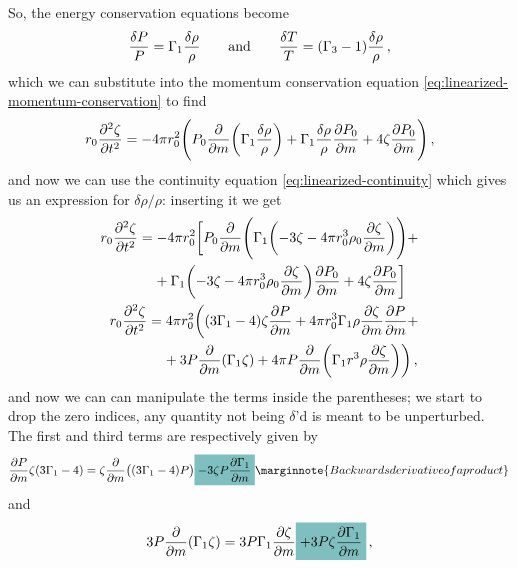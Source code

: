 \documentclass[main.tex]{subfiles}
\begin{document}
So, the energy conservation equations become 
%
\begin{align}
\frac{ \delta P}{P} = \Gamma_1 \frac{ \delta \rho }{\rho }
\qquad \text{and} \qquad
\frac{ \delta T }{T} = \qty(\Gamma_3 -1) \frac{ \delta \rho }{\rho }
\,,
\end{align}
%
which we can substitute into the momentum conservation equation \eqref{eq:linearized-momentum-conservation} to find 
%
\begin{align}
r_0 \pdv[2]{\zeta }{t} = 
- 4 \pi r_0^2 \qty(
P_0 \pdv{}{m} \qty(\Gamma_1  \frac{ \delta \rho}{\rho })
+ \Gamma_1 \frac{ \delta \rho }{\rho } \pdv{P_0}{m}
+ 4 \zeta \pdv{P_0 }{m}
)
\,,
\end{align}
%
and now we can use the continuity equation \eqref{eq:linearized-continuity} which gives us an expression for \(\delta \rho  / \rho \): inserting it we get 
%
\begin{align}
\begin{split}
r_0 \pdv[2]{\zeta }{t} &= 
- 4 \pi r_0^2 \bigg[
P_0 \pdv{}{m} \qty(\Gamma_1  \qty(-3\zeta - 4 \pi r_0^3 \rho_0 \pdv{\zeta }{m})) + \\
&\phantom{=}\ + \Gamma_1 \qty(- 3\zeta - 4 \pi r_0^3 \rho_0 \pdv{\zeta }{m}) \pdv{P_0}{m}
+ 4 \zeta \pdv{P_0 }{m}
\bigg]
\end{split}  \\
\label{eq:step0-LAWE-derivation-substituted}
\begin{split}
r_0 \pdv[2]{\zeta }{t} &= 4 \pi r_0^2 \bigg(
(3 \Gamma_1 - 4)\zeta \pdv{P}{m} 
+ 4 \pi r_0^3 \Gamma_1 \rho \pdv{\zeta }{m} \pdv{P}{m} + \\
&\phantom{=}\ 
+ 3 P \pdv{}{m} \qty(\Gamma_1 \zeta ) 
+ 4 \pi P \pdv{}{m} \qty(\Gamma_1 r^3 \rho \pdv{\zeta }{m})
\bigg)
\,,
\end{split}
\end{align}
%
and now we can can manipulate the terms inside the parentheses; we start to drop the zero indices, any quantity not being \(\delta \)'d is meant to be unperturbed.
The first and third terms are respectively given by  
%
\begin{align}
\pdv{P}{m} \zeta \qty(3 \Gamma_1 - 4) =
\zeta \pdv{}{m} \qty((3 \Gamma_1 - 4) P) \hlc{teal}{-3 \zeta P \pdv{\Gamma_1}{m}} \marginnote{Backwards derivative of a product}
\,
\end{align}
%
and 
%
\begin{align} \label{eq:step1-LAWE-derivation}
3 P \pdv{}{m} \qty(\Gamma_1 \zeta ) = 3P \Gamma_1 \pdv{\zeta }{m} \hlc{teal}{+ 3 P \zeta \pdv{\Gamma_1 }{m}}
\,,
\end{align}
\end{document}
